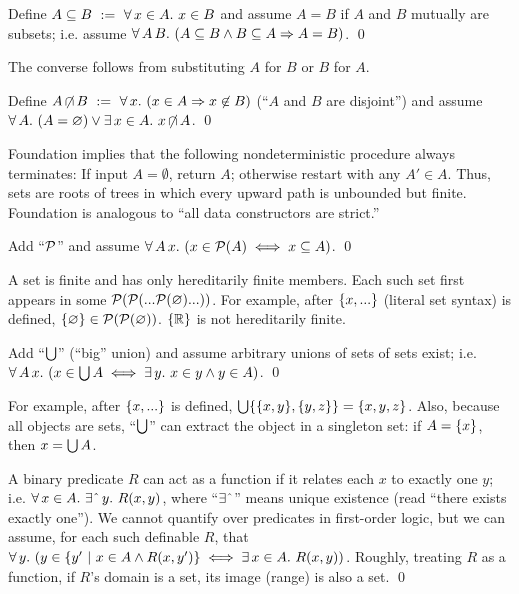 \begin{axiom}[extensionality] Define $A \subseteq B\ :=\ \forall\,{x \in A}\ldotp\,{x \in B}$ and assume $A = B$ if $A$ and $B$ mutually are subsets; i.e.
assume $\forall\,{A\,B}\ldotp\,{(A \subseteq B \wedge B \subseteq A \Rightarrow A = B)}$.
\qed
\end{axiom}

The converse follows from substituting $A$ for $B$ or $B$ for $A$.

\begin{axiom}[foundation]
\label{axm:founcation}
Define $A \operatorname{\mbox{$\not\mspace{-5mu}\cap$}} B\ :=\ \forall\,{x}\ldotp\,{(x \in A \Rightarrow x \not\in B)}$ (``$A$ and $B$ are disjoint'') and assume $\forall\,{A}\ldotp\,{(A = \varnothing) \vee \exists\,{x \in A}\ldotp\,{x \operatorname{\mbox{$\not\mspace{-5mu}\cap$}} A}}$.
\qed
\end{axiom}

Foundation implies that the following nondeterministic procedure always terminates: If input $A = \emptyset$, return $A$; otherwise restart with any $A' \in A$.
Thus, sets are roots of trees in which every upward path is unbounded but finite. Foundation is analogous to ``all data constructors are strict.''

\begin{axiom}[powerset]
\label{axm:powerset}
Add ``$\mathcal{P}$'' and assume $\forall\,{A\,x}\ldotp\,(x \in \mathcal{P}(A) \iff x \subseteq A)$.
\qed
\end{axiom}

A  set is finite and has only hereditarily finite members.
Each such set first appears in some $\mathcal{P}(\mathcal{P}(...\mathcal{P}(\varnothing)...))$.
For example, after $\{{x,...}\}$ (literal set syntax) is defined, $\{{\varnothing}\} \in \mathcal{P}(\mathcal{P}(\varnothing))$. $\{{\mathbb{R}}\}$ is not hereditarily finite.

\begin{axiom}[union]
\label{axm:union}
Add ``$\textstyle\bigcup$'' (``big'' union) and assume arbitrary unions of sets of sets exist; i.e. $\forall\,{A\,x}\ldotp\,( x \in \textstyle\bigcup A \iff \exists\,{y}\ldotp\, x \in y \wedge y \in A)$.
\qed
\end{axiom}

For example, after $\{{x,...}\}$ is defined, $\textstyle\bigcup \{{\{{x,y}\},\{{y,z}\}}\} = \{{x,y,z}\}$. Also, because all objects are sets, ``$\textstyle\bigcup$'' can extract the object in a singleton set: if $A = \{{x}\}$, then $x = \textstyle\bigcup A$.

\begin{axiom}
\label{axm:replacement}
A binary predicate $R$ can act as a function if it relates each $x$ to exactly one $y$; i.e. $\Forall{x \in A}{\ExistsOne{y}{R(x,y)}}$, where ``$\exists\char`\^$'' means unique existence (read ``there exists exactly one''). We cannot quantify over predicates in first-order logic, but we can assume, for each such definable $R$, that $\forall\,{y}\ldotp\, (y \in \lbrace {y'} \ \lvert\ {x \in A \wedge R(x,y')} \rbrace \iff \exists\,{x \in A}\ldotp\, R(x,y))$. Roughly, treating $R$ as a function, if $R$'s domain is a set, its image (range) is also a set.
\qed
\end{axiom}

